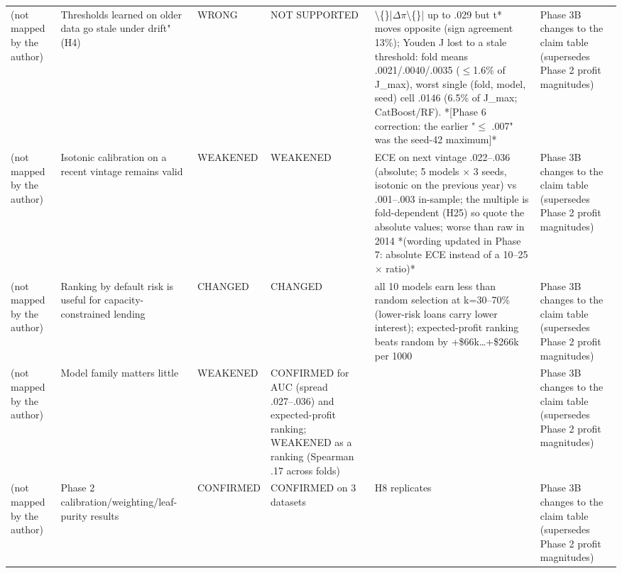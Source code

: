 \begin{table}[t]
\begin{tabular}{lp{5.2cm}lp{5.2cm}p{5.2cm}p{5.2cm}}
(not mapped by the author) & Thresholds learned on older data go stale under drift" (H4) & WRONG & NOT SUPPORTED & \textbackslash\{\}|$\Delta$$\pi$\textbackslash\{\}| up to .029 but t* moves opposite (sign agreement 13\%); Youden J lost to a stale threshold: fold means .0021/.0040/.0035 ($\leq$1.6\% of J\_max), worst single (fold, model, seed) cell .0146 (6.5\% of J\_max; CatBoost/RF). *[Phase 6 correction: the earlier "$\leq$ .007" was the seed-42 maximum]* & Phase 3B changes to the claim table (supersedes Phase 2 profit magnitudes) \\
(not mapped by the author) & Isotonic calibration on a recent vintage remains valid & WEAKENED & WEAKENED & ECE on next vintage .022--.036 (absolute; 5 models $\times$ 3 seeds, isotonic on the previous year) vs .001--.003 in-sample; the multiple is fold-dependent (H25) so quote the absolute values; worse than raw in 2014 *(wording updated in Phase 7: absolute ECE instead of a 10--25$\times$ ratio)* & Phase 3B changes to the claim table (supersedes Phase 2 profit magnitudes) \\
(not mapped by the author) & Ranking by default risk is useful for capacity-constrained lending & CHANGED & CHANGED & all 10 models earn less than random selection at k=30--70\% (lower-risk loans carry lower interest); expected-profit ranking beats random by +\$66k…+\$266k per 1000 & Phase 3B changes to the claim table (supersedes Phase 2 profit magnitudes) \\
(not mapped by the author) & Model family matters little & WEAKENED & CONFIRMED for AUC (spread .027--.036) and expected-profit ranking; WEAKENED as a ranking (Spearman .17 across folds) &  & Phase 3B changes to the claim table (supersedes Phase 2 profit magnitudes) \\
(not mapped by the author) & Phase 2 calibration/weighting/leaf-purity results & CONFIRMED & CONFIRMED on 3 datasets & H8 replicates & Phase 3B changes to the claim table (supersedes Phase 2 profit magnitudes) \\
\bottomrule
\end{tabular}
\end{table}

